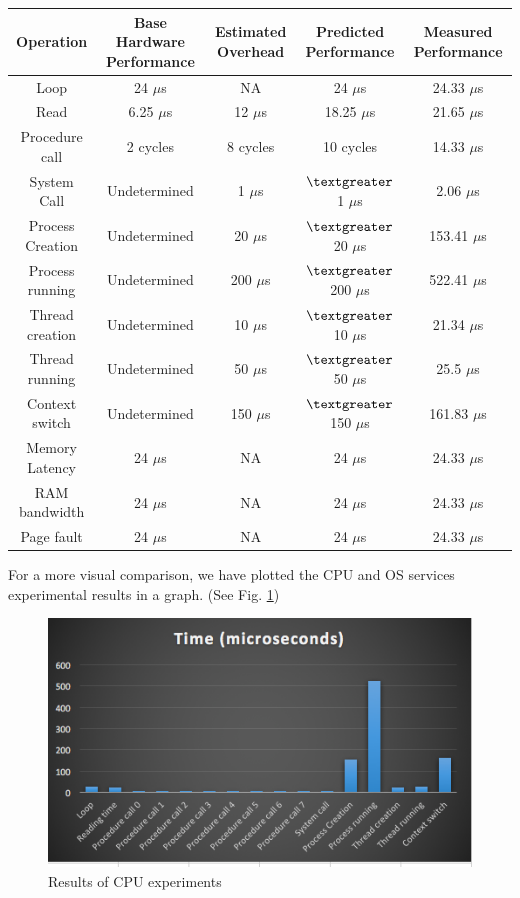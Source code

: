 \documentclass[conference]{IEEEtran}
\begin{document}
\begin{center}
\begin{tabular} { |c|c|c|c|c| } 
  \hline
  \textbf{Operation} & \textbf{Base Hardware Performance} & \textbf{Estimated Overhead} & \textbf{Predicted Performance} & \textbf{Measured Performance} \\
  \hline
  Loop & 24 $\mu$s & NA & 24 $\mu$s & 24.33 $\mu$s \\
  \hline
  Read & 6.25 $\mu$s & 12 $\mu$s & 18.25 $\mu$s & 21.65 $\mu$s \\
  \hline
  Procedure call  & 2 cycles & 8 cycles & 10 cycles & 14.33 $\mu$s \\
  \hline
  System Call & Undetermined & 1 $\mu$s & $\textgreater$1 $\mu$s & 2.06 $\mu$s \\
  \hline
  Process Creation & Undetermined & 20 $\mu$s & $\textgreater$20 $\mu$s & 153.41 $\mu$s \\
  \hline
  Process running & Undetermined & 200 $\mu$s & $\textgreater$200 $\mu$s & 522.41 $\mu$s \\
  \hline
  Thread creation & Undetermined & 10 $\mu$s & $\textgreater$10 $\mu$s & 21.34 $\mu$s \\
  \hline
  Thread running & Undetermined & 50 $\mu$s & $\textgreater$50 $\mu$s & 25.5 $\mu$s \\
  \hline
  Context switch & Undetermined & 150 $\mu$s & $\textgreater$150 $\mu$s & 161.83 $\mu$s \\
  \hline
  Memory Latency & 24 $\mu$s & NA & 24 $\mu$s & 24.33 $\mu$s \\
  \hline
  RAM bandwidth & 24 $\mu$s & NA & 24 $\mu$s & 24.33 $\mu$s \\
  \hline
  Page fault & 24 $\mu$s & NA & 24 $\mu$s & 24.33 $\mu$s \\
  \hline
  
\end{tabular}
\end{center}

For a more visual comparison, we have plotted the CPU and OS services experimental results in a graph. (See Fig. \ref{fig:graph1})

\begin{figure}[h]
\centering
\includegraphics[scale=0.5]{graph1.png}
\caption{Results of CPU experiments}
\label{fig:graph1}
\end{figure}
\end{document}
